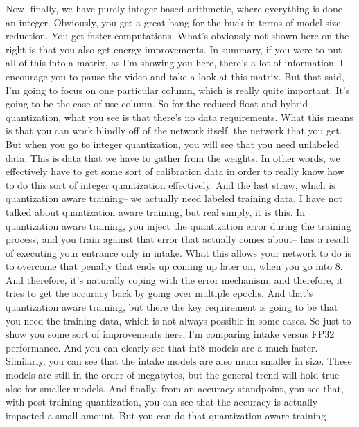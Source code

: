 {{{{{    Now, finally, we have purely integer-based arithmetic,
    where everything is done an integer.
    Obviously, you get a great bang for the buck in terms of model size reduction.
    You get faster computations.
    What's obviously not shown here on the right
    is that you also get energy improvements.
    In summary, if you were to put all of this into a matrix,
    as I'm showing you here, there's a lot of information.
    I encourage you to pause the video and take a look at this matrix.
    But that said, I'm going to focus on one particular column, which
    is really quite important.
    It's going to be the ease of use column.
    So for the reduced float and hybrid quantization, what you see
    is that there's no data requirements.
    What this means is that you can work blindly off of the network itself,
    the network that you get.
    But when you go to integer quantization, you
    will see that you need unlabeled data.
    This is data that we have to gather from the weights.
    In other words, we effectively have to get some sort of calibration data
    in order to really know how to do this sort of integer quantization
    effectively.
    And the last straw, which is quantization aware training--
    we actually need labeled training data.
    I have not talked about quantization aware training,
    but real simply, it is this.
    In quantization aware training, you inject the quantization error
    during the training process, and you train
    against that error that actually comes about-- has a result of executing
    your entrance only in intake.
    What this allows your network to do is to overcome that penalty that ends up
    coming up later on, when you go into 8.
    And therefore, it's naturally coping with the error mechanism,
    and therefore, it tries to get the accuracy back
    by going over multiple epochs.
    And that's quantization aware training, but there the key requirement
    is going to be that you need the training data, which is not always
    possible in some cases.
    So just to show you some sort of improvements here,
    I'm comparing intake versus FP32 performance.
    And you can clearly see that int8 models are a much faster.
    Similarly, you can see that the intake models are also much smaller in size.
    These models are still in the order of megabytes,
    but the general trend will hold true also for smaller models.
    And finally, from an accuracy standpoint,
    you see that, with post-training quantization,
    you can see that the accuracy is actually impacted a small amount.
    But you can do that quantization aware training
}}}}}
